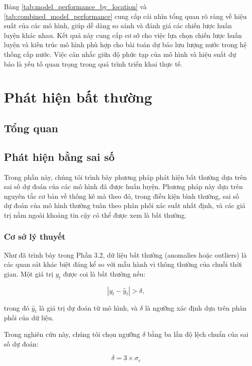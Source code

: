 Bảng \ref{tab:model_performance_by_location} và \ref{tab:combined_model_performance} cung cấp cái nhìn tổng quan rõ ràng về hiệu suất của các mô hình, giúp dễ dàng so sánh và đánh giá các chiến lược huấn luyện khác nhau. Kết quả này cung cấp cơ sở cho việc lựa chọn chiến lược huấn luyện và kiến trúc mô hình phù hợp cho bài toán dự báo lưu lượng nước trong hệ thống cấp nước. Việc cân nhắc giữa độ phức tạp của mô hình và hiệu suất dự báo là yếu tố quan trọng trong quá trình triển khai thực tế.


\section{Phát hiện bất thường}
\subsection{Tổng quan}

\subsection{Phát hiện bằng sai số}
Trong phần này, chúng tôi trình bày phương pháp phát hiện bất thường dựa trên sai số dự đoán của các mô hình đã được huấn luyện. Phương pháp này dựa trên nguyên tắc cơ bản về thống kê mà theo đó, trong điều kiện bình thường, sai số dự đoán của mô hình thường tuân theo phân phối xác suất nhất định, và các giá trị nằm ngoài khoảng tin cậy có thể được xem là bất thường.

\subsubsection{Cơ sở lý thuyết}
Như đã trình bày trong Phần 3.2, dữ liệu bất thường (anomalies hoặc outliers) là các quan sát khác biệt đáng kể so với mẫu hành vi thông thường của chuỗi thời gian. Một giá trị \( y_t \) được coi là bất thường nếu:

\begin{equation}
    |y_t - \hat{y}_t| > \delta,
\end{equation}

trong đó \(\hat{y}_t\) là giá trị dự đoán từ mô hình, và \(\delta\) là ngưỡng xác định dựa trên phân phối của dữ liệu.

Trong nghiên cứu này, chúng tôi chọn ngưỡng \(\delta\) bằng ba lần độ lệch chuẩn của sai số dự đoán:

\begin{equation}
\delta = 3 \times \sigma_e
\end{equation}

